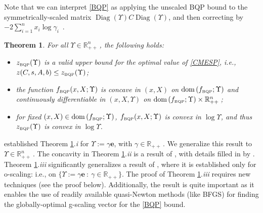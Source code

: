 \documentclass[smallextended]{svjour3hack}       %
\newtheorem{thm}{Theorem}{\bf}{\rm}
\DeclareMathOperator{\Diag}{Diag}
\DeclareMathOperator{\dom}{dom}
\begin{document}
Note that we can interpret \ref{BQP} as applying the
unscaled BQP bound to the symmetri\-cally-scaled
matrix $\Diag(\Upsilon)C\Diag(\Upsilon)$, and then
correcting by $- 2\sum_{i=1}^n  \!x_i\log \gamma_i$~.

\begin{thm}\label{thm:bqp}
For all $\Upsilon \in \mathbb{R}_{++}^n$\,, %
the following holds:
\begin{itemize}
\item[\ref{thm:bqp}.i.] \label{bqp.i}  $z_{{\tiny\mbox{BQP}}}(\Upsilon)$ is a valid upper bound for the optimal value of \ref{CMESP}, i.e., $z(C,s,A,b)\leq z_{{\tiny\mbox{BQP}}}(\Upsilon)$;
\item[\ref{thm:bqp}.ii.] \label{bqp.ii} the function $f_{{\tiny\mbox{BQP}}}(x,X;\Upsilon)$ is concave in $(x,X)$ on $\dom\left(f_{{\tiny\mbox{BQP}}};\Upsilon\right)$ and continuously differentiable in $(x,X, \Upsilon)$ on
$\dom\left(f_{{\tiny\mbox{BQP}}};\Upsilon\right) \times \mathbb{R}_{++}^n$\,;
\item[\ref{thm:bqp}.iii.] \label{bqp.iii} for fixed $(x,X)\in \dom\left(f_{{\tiny\mbox{BQP}}};\Upsilon\right)$, $f_{{\tiny\mbox{BQP}}}(x,X;\Upsilon)$ is convex in $\log \Upsilon$, and thus $z_{{\tiny\mbox{BQP}}}(\Upsilon)$ is convex in $\log \Upsilon$.
\end{itemize}
\end{thm}

\begin{remark}
\noindent \cite{Anstreicher_BQP_entropy} established Theorem \ref{thm:bqp}.\emph{i} for $\Upsilon:=\gamma\mathbf{e}$, with $\gamma\in \mathbb{R}_{++}$\,. We generalize this result to $\Upsilon\in \mathbb{R}^n_{++}$\,. The concavity in Theorem \ref{thm:bqp}.\emph{ii}
is a result of \cite{Anstreicher_BQP_entropy}, with details
filled in by \cite[Section 3.6.1]{FLbook}. Theorem \ref{thm:bqp}.\emph{iii}
significantly generalizes a result of \cite{chen_mixing}, where it is
established only for o-scaling: i.e., on $\{ \Upsilon:= \gamma \mathbf{e} ~:~ \gamma\in \mathbb{R}_{++}\}$. The proof of Theorem \ref{thm:bqp}.\emph{iii} requires new techniques (see the proof below). Additionally, the result is quite important as it enables the use of readily available quasi-Newton methods (like BFGS) for finding the globally-optimal g-scaling vector for the \ref{BQP} bound.
\end{remark}
\end{document}
